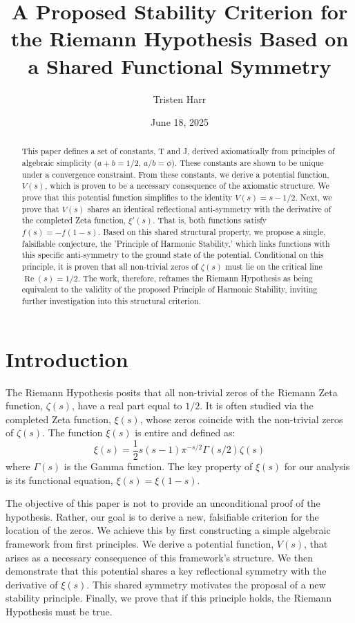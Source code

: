 \documentclass{amsart}
\theoremstyle{plain}
\theoremstyle{definition}
\theoremstyle{remark}
\DeclareMathOperator{\re}{Re}
\begin{document}
\title[A Proposed Stability Criterion for the RH]{A Proposed Stability Criterion for the Riemann Hypothesis Based on a Shared Functional Symmetry}
\author{Tristen Harr}
\date{June 18, 2025}
\address{Saint Charles, Missouri, United States}

\begin{abstract}
This paper defines a set of constants, T and J, derived axiomatically from principles of algebraic simplicity ($a+b=1/2$, $a/b=\phi$).  These constants are shown to be unique under a convergence constraint.  From these constants, we derive a potential function, $V(s)$, which is proven to be a necessary consequence of the axiomatic structure. We prove that this potential function simplifies to the identity $V(s) = s - 1/2$.  Next, we prove that $V(s)$ shares an identical reflectional anti-symmetry with the derivative of the completed Zeta function, $\xi'(s)$.  That is, both functions satisfy $f(s) = -f(1-s)$.  Based on this shared structural property, we propose a single, falsifiable conjecture, the 'Principle of Harmonic Stability,' which links functions with this specific anti-symmetry to the ground state of the potential. Conditional on this principle, it is proven that all non-trivial zeros of $\zeta(s)$ must lie on the critical line $\re(s)=1/2$.  The work, therefore, reframes the Riemann Hypothesis as being equivalent to the validity of the proposed Principle of Harmonic Stability, inviting further investigation into this structural criterion. 
\end{abstract}

\maketitle

\section{Introduction}
The Riemann Hypothesis posits that all non-trivial zeros of the Riemann Zeta function, $\zeta(s)$, have a real part equal to $1/2$.  It is often studied via the completed Zeta function, $\xi(s)$, whose zeros coincide with the non-trivial zeros of $\zeta(s)$.  The function $\xi(s)$ is entire and defined as: 
$$ \xi(s) = \frac{1}{2}s(s-1)\pi^{-s/2}\Gamma(s/2)\zeta(s) $$
where $\Gamma(s)$ is the Gamma function. The key property of $\xi(s)$ for our analysis is its functional equation, $\xi(s) = \xi(1-s)$. 

The objective of this paper is not to provide an unconditional proof of the hypothesis. Rather, our goal is to derive a new, falsifiable criterion for the location of the zeros. We achieve this by first constructing a simple algebraic framework from first principles. We derive a potential function, $V(s)$, that arises as a necessary consequence of this framework's structure. We then demonstrate that this potential shares a key reflectional symmetry with the derivative of $\xi(s)$. This shared symmetry motivates the proposal of a new stability principle. Finally, we prove that if this principle holds, the Riemann Hypothesis must be true.
\end{document}
